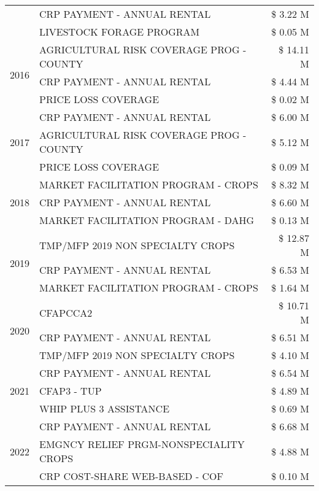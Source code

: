\begin{tabular}{llr}
 & CRP PAYMENT - ANNUAL RENTAL & \$ 3.22 M \\
 & LIVESTOCK FORAGE PROGRAM & \$ 0.05 M \\
\cline{1-3}
\multirow[t]{3}{*}{2016} & AGRICULTURAL RISK COVERAGE PROG - COUNTY & \$ 14.11 M \\
 & CRP PAYMENT - ANNUAL RENTAL & \$ 4.44 M \\
 & PRICE LOSS COVERAGE & \$ 0.02 M \\
\cline{1-3}
\multirow[t]{3}{*}{2017} & CRP PAYMENT - ANNUAL RENTAL & \$ 6.00 M \\
 & AGRICULTURAL RISK COVERAGE PROG - COUNTY & \$ 5.12 M \\
 & PRICE LOSS COVERAGE & \$ 0.09 M \\
\cline{1-3}
\multirow[t]{3}{*}{2018} & MARKET FACILITATION PROGRAM - CROPS & \$ 8.32 M \\
 & CRP PAYMENT - ANNUAL RENTAL & \$ 6.60 M \\
 & MARKET FACILITATION PROGRAM - DAHG & \$ 0.13 M \\
\cline{1-3}
\multirow[t]{3}{*}{2019} & TMP/MFP 2019 NON SPECIALTY CROPS & \$ 12.87 M \\
 & CRP PAYMENT - ANNUAL RENTAL & \$ 6.53 M \\
 & MARKET FACILITATION PROGRAM - CROPS & \$ 1.64 M \\
\cline{1-3}
\multirow[t]{3}{*}{2020} & CFAPCCA2 & \$ 10.71 M \\
 & CRP PAYMENT - ANNUAL RENTAL & \$ 6.51 M \\
 & TMP/MFP 2019 NON SPECIALTY CROPS & \$ 4.10 M \\
\cline{1-3}
\multirow[t]{3}{*}{2021} & CRP PAYMENT - ANNUAL RENTAL & \$ 6.54 M \\
 & CFAP3 - TUP & \$ 4.89 M \\
 & WHIP PLUS 3 ASSISTANCE & \$ 0.69 M \\
\cline{1-3}
\multirow[t]{3}{*}{2022} & CRP PAYMENT - ANNUAL RENTAL & \$ 6.68 M \\
 & EMGNCY RELIEF PRGM-NONSPECIALITY CROPS & \$ 4.88 M \\
 & CRP COST-SHARE WEB-BASED - COF & \$ 0.10 M \\
\cline{1-3}
\bottomrule
\end{tabular}
